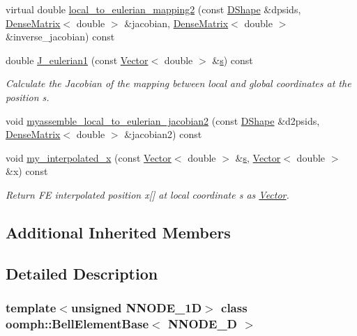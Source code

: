 \begin{DoxyCompactItemize}
virtual double \hyperlink{classoomph_1_1BellElementBase_a20792e4f9ae0fcfadc406c4fca5ca0f6}{local\+\_\+to\+\_\+eulerian\+\_\+mapping2} (const \hyperlink{classoomph_1_1DShape}{D\+Shape} \&dpsids, \hyperlink{classoomph_1_1DenseMatrix}{Dense\+Matrix}$<$ double $>$ \&jacobian, \hyperlink{classoomph_1_1DenseMatrix}{Dense\+Matrix}$<$ double $>$ \&inverse\+\_\+jacobian) const
\item 
double \hyperlink{classoomph_1_1BellElementBase_ae19c2d108290a6d46d6453ea324820f6}{J\+\_\+eulerian1} (const \hyperlink{classoomph_1_1Vector}{Vector}$<$ double $>$ \&\hyperlink{cfortran_8h_ab7123126e4885ef647dd9c6e3807a21c}{s}) const
\begin{DoxyCompactList}\small\item\em Calculate the Jacobian of the mapping between local and global coordinates at the position s. \end{DoxyCompactList}\item 
void \hyperlink{classoomph_1_1BellElementBase_abd5f258248221f2f564c87ced9e0a83e}{myassemble\+\_\+local\+\_\+to\+\_\+eulerian\+\_\+jacobian2} (const \hyperlink{classoomph_1_1DShape}{D\+Shape} \&d2psids, \hyperlink{classoomph_1_1DenseMatrix}{Dense\+Matrix}$<$ double $>$ \&jacobian2) const
\item 
void \hyperlink{classoomph_1_1BellElementBase_a4dfe41d9fa313dcc843d17144c553190}{my\+\_\+interpolated\+\_\+x} (const \hyperlink{classoomph_1_1Vector}{Vector}$<$ double $>$ \&\hyperlink{cfortran_8h_ab7123126e4885ef647dd9c6e3807a21c}{s}, \hyperlink{classoomph_1_1Vector}{Vector}$<$ double $>$ \&x) const
\begin{DoxyCompactList}\small\item\em Return FE interpolated position x\mbox{[}\mbox{]} at local coordinate s as \hyperlink{classoomph_1_1Vector}{Vector}. \end{DoxyCompactList}\end{DoxyCompactItemize}
\subsection*{Additional Inherited Members}


\subsection{Detailed Description}
\subsubsection*{template$<$unsigned N\+N\+O\+D\+E\+\_\+1D$>$\newline
class oomph\+::\+Bell\+Element\+Base$<$ N\+N\+O\+D\+E\+\_\+D $>$}

